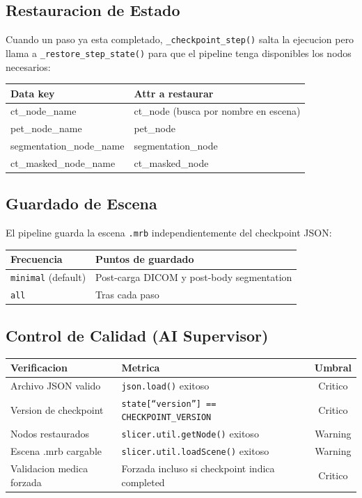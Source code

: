 \documentclass[12pt,a4paper]{article}
\begin{document}
\subsection{Restauracion de Estado}

Cuando un paso ya esta completado, \texttt{\_checkpoint\_step()} salta la ejecucion pero llama a
\texttt{\_restore\_step\_state()} para que el pipeline tenga disponibles los nodos necesarios:

\begin{table}[H]
\centering
\begin{tabular}{l l}
\toprule
\textbf{Data key} & \textbf{Attr a restaurar} \\
\midrule
ct\_node\_name & ct\_node (busca por nombre en escena) \\
pet\_node\_name & pet\_node \\
segmentation\_node\_name & segmentation\_node \\
ct\_masked\_node\_name & ct\_masked\_node \\
\bottomrule
\end{tabular}
\end{table}

\subsection{Guardado de Escena}

El pipeline guarda la escena \texttt{.mrb} independientemente del checkpoint JSON:

\begin{table}[H]
\centering
\begin{tabular}{l l}
\toprule
\textbf{Frecuencia} & \textbf{Puntos de guardado} \\
\midrule
\texttt{minimal} (default) & Post-carga DICOM y post-body segmentation \\
\texttt{all} & Tras cada paso \\
\bottomrule
\end{tabular}
\end{table}

\subsection{Control de Calidad (AI Supervisor)}

\begin{table}[H]
\centering
\begin{tabular}{llc}
\toprule
\textbf{Verificacion} & \textbf{Metrica} & \textbf{Umbral} \\
\midrule
Archivo JSON valido & \texttt{json.load()} exitoso & Critico \\
Version de checkpoint & \texttt{state[``version''] == CHECKPOINT\_VERSION} & Critico \\
Nodos restaurados & \texttt{slicer.util.getNode()} exitoso & Warning \\
Escena .mrb cargable & \texttt{slicer.util.loadScene()} exitoso & Warning \\
Validacion medica forzada & Forzada incluso si checkpoint indica completed & Critico \\
\bottomrule
\end{tabular}
\end{table}
\end{document}
